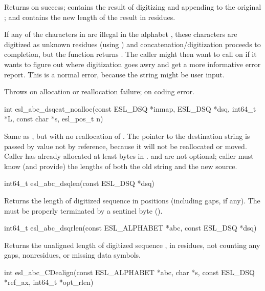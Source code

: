 \begin{sreapi}
Returns  on success;  contains the result of digitizing
and appending  to the original ; and  contains
the new length of the  result in residues.

If any of the characters in  are illegal in the
alphabet , these characters are digitized as
unknown residues (using ) and
concatenation/digitization proceeds to completion, but
the function returns . The caller might then
want to call  on  if it wants
to figure out where digitization goes awry and get a
more informative error report. This is a normal error,
because the string  might be user input.

Throws  on allocation or reallocation failure;
 on coding error.



\hypertarget{func:esl_abc_dsqcat_noalloc()}
{\item[int esl\_abc\_dsqcat\_noalloc(const ESL\_DSQ *inmap, ESL\_DSQ *dsq, int64\_t *L, const char *s, esl\_pos\_t n)]}

Same as , but with no reallocation of
. The pointer to the destination string  is 
passed by value not by reference, because it will not
be reallocated or moved. Caller has already allocated 
at least  bytes in .  and  are
not optional; caller must know (and provide) the lengths
of both the old string and the new source.



\hypertarget{func:esl_abc_dsqlen()}
{\item[int64\_t esl\_abc\_dsqlen(const ESL\_DSQ *dsq)]}

Returns the length of digitized sequence  in
positions (including gaps, if any). The  must be
properly terminated by a sentinel byte
().  


\hypertarget{func:esl_abc_dsqrlen()}
{\item[int64\_t esl\_abc\_dsqrlen(const ESL\_ALPHABET *abc, const ESL\_DSQ *dsq)]}

Returns the unaligned length of digitized sequence
, in residues, not counting any gaps, nonresidues,
or missing data symbols. 


\hypertarget{func:esl_abc_CDealign()}
{\item[int esl\_abc\_CDealign(const ESL\_ALPHABET *abc, char *s, const ESL\_DSQ *ref\_ax, int64\_t *opt\_rlen)]}


\end{sreapi}
